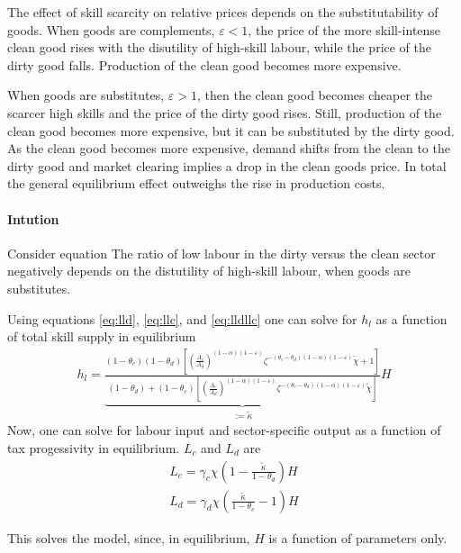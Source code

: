 \begin{prop} 
	
	The effect of skill scarcity on relative prices depends on the substitutability of goods. When goods are complements, $\varepsilon<1$, the price of the more skill-intense clean good rises with the disutility of high-skill labour, while the price of the dirty good falls.
	Production of the clean good becomes more expensive. 
	
	When goods are substitutes, $\varepsilon>1$, then the clean good becomes cheaper the scarcer high skills and the price of the dirty good rises. Still, production of the clean good becomes more expensive, but it can be substituted by the dirty good. As the clean good becomes more expensive, demand shifts from the clean to the dirty good and market clearing implies a drop in the clean goods price. In total the general equilibrium effect outweighs the rise in production costs. 
\end{prop}

\paragraph{Intution}
Consider equation
The ratio of low labour in the dirty versus the clean sector negatively depends on the distutility of high-skill labour, when goods are substitutes.


Using equations \ref{eq:lld}, \ref{eq:llc}, and \ref{eq:lldllc} one can solve for $h_l$ as a function of total skill supply in equilibrium
\begin{align}
h_l= \underbrace{\frac{(1-\theta_c)(1-\theta_d)\left[\left(\frac{A_c}{A_d}\right)^{(1-\alpha)(1-\varepsilon)}\zeta^{-(\theta_c-\theta_d)(1-\alpha)(1-\varepsilon)}\tilde{\chi}+1\right]}{(1-\theta_d)+(1-\theta_c)\left[\left(\frac{A_c}{A_d}\right)^{(1-\alpha)(1-\varepsilon)}\zeta^{-(\theta_c-\theta_d)(1-\alpha)(1-\varepsilon)}\tilde{\chi}\right]}}_{:=\tilde{\kappa}}H
\end{align}
Now, one can solve for labour input and sector-specific output as a function of tax progessivity  in equilibrium. 
$L_c$ and $L_d$ are
\begin{align}
L_c= \gamma_c \chi \left(1-\frac{\tilde{\kappa}}{1-\theta_d}\right)H\\
L_d= \gamma_d \chi \left(\frac{\tilde{\kappa}}{1-\theta_c}-1\right)H
\end{align}

This solves the model, since, in equilibrium, $H$ is a function of parameters only. 


